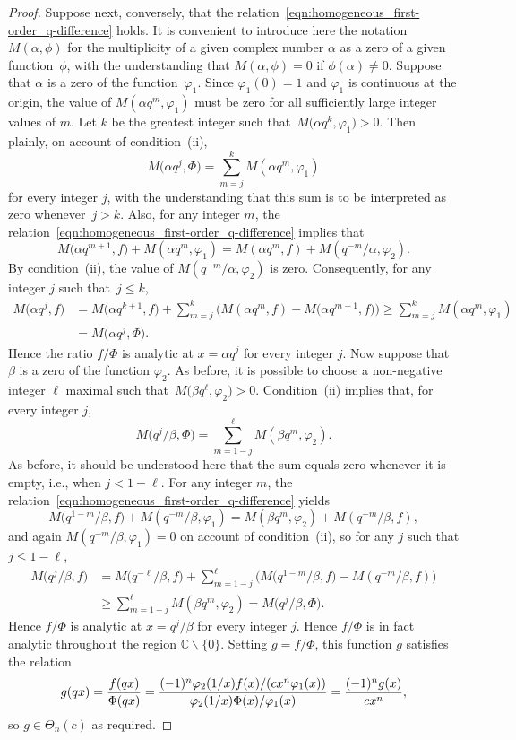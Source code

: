 \documentclass[10pt,a4paper]{amsart}
\numberwithin{equation}{section}
\newcommand{\C}{\mathbb{C}}
\begin{document}
\begin{proof}
Suppose next, conversely, that the relation~\eqref{eqn:homogeneous_first-order_q-difference} holds. It is convenient to introduce here the notation $M(\alpha,\phi)$ for the multiplicity of a given complex number $\alpha$ as a zero of a given function~$\phi$, with the understanding that $M(\alpha,\phi)=0$ if $\phi(\alpha) \neq 0$. Suppose that $\alpha$ is a zero of the function~$\varphi_1$. Since $\varphi_1(0)=1$ and $\varphi_1$ is continuous at the origin, the value of $M(\alpha q^m,\varphi_1)$ must be zero for all sufficiently large integer values of $m$. Let $k$ be the greatest integer such that~$M\bigl(\alpha q^{k},\varphi_1\bigr)>0$. Then plainly, on account of condition~(ii),
\[ M\bigl(\alpha q^j,\Phi\bigr) = \sum_{m=j}^k M(\alpha q^m,\varphi_1) \]
for every integer $j$, with the understanding that this sum is to be interpreted as zero whenever~${j>k}$. Also, for any integer $m$, the relation~\eqref{eqn:homogeneous_first-order_q-difference} implies that
\[ M\bigl(\alpha q^{m+1},f\bigr) + M(\alpha q^m,\varphi_1) = M(\alpha q^m,f) + M(q^{-m}/\alpha,\varphi_2). \]
By condition~(ii), the value of $M(q^{-m}/\alpha,\varphi_2)$ is zero. Consequently, for any integer $j$ such that~${j \leq k}$,
\begin{align*}
 M\bigl(\alpha q^j,f\bigr) &= M\bigl(\alpha q^{k+1},f\bigr) + \sum_{m=j}^{k} \bigl( M(\alpha q^m,f) - M\bigl(\alpha q^{m+1},f\bigr) \bigr) \geq \sum_{m=j}^{k} M(\alpha q^m,\varphi_1)\\
 & = M\bigl(\alpha q^j,\Phi\bigr).
 \end{align*}
Hence the ratio $f/\Phi$ is analytic at $x=\alpha q^j$ for every integer $j$. Now suppose that $\beta$ is a zero of the function $\varphi_2$. As before, it is possible to choose a non-negative integer $\ell$ maximal such that~${M\bigl(\beta q^\ell,\varphi_2\bigr)>0}$. Condition~(ii) implies that, for every integer $j$,
\[ M\bigl(q^j/\beta,\Phi\bigr) = \sum_{m=1-j}^{\ell} M(\beta q^{m},\varphi_2). \]
As before, it should be understood here that the sum equals zero whenever it is empty, i.e., when $j < 1-\ell$. For any integer $m$, the relation~\eqref{eqn:homogeneous_first-order_q-difference} yields
\[ M\bigl(q^{1-m}/\beta,f\bigr) + M(q^{-m}/\beta,\varphi_1) = M(\beta q^m,\varphi_2) + M(q^{-m}/\beta,f), \]
and again $M(q^{-m}/\beta,\varphi_1)=0$ on account of condition~(ii), so for any $j$ such that $j \leq 1-\ell$,
\begin{align*}
M\bigl(q^j/\beta,f\bigr) &= M\bigl(q^{-\ell}/\beta,f\bigr) + \sum_{m=1-j}^{\ell} \bigl( M\bigl(q^{1-m}/\beta,f\bigr) - M(q^{-m}/\beta,f) \bigr) \\
&\geq \sum_{m=1-j}^{\ell} M(\beta q^m,\varphi_2) = M\bigl(q^j/\beta,\Phi\bigr).
\end{align*}
Hence $f/\Phi$ is analytic at $x=q^j/\beta$ for every integer $j$. Hence $f/\Phi$ is in fact analytic throughout the region $\C\backslash\{0\}$. Setting $g=f/\Phi$, this function $g$ satisfies the relation
\[ g(qx) = {f(qx) \over \Phi(qx)} = {(-1)^n \varphi_2(1/x) f(x) / (cx^n \varphi_1(x)) \over \varphi_2(1/x) \Phi(x)/\varphi_1(x)} = {(-1)^n g(x) \over cx^n}, \]
so $g \in \Theta_n(c)$ as required.
\end{proof}
\end{document}
